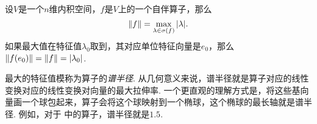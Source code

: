 \begin{theorem}\label{thm:symmetric-operator-norm}
    设$V$是一个$n$维内积空间，$f$是$V$上的一个自伴算子，那么
    \[\left\|f\right\|=\max_{\lambda\in\sigma(f)}|\lambda|.\]
    如果最大值在特征值$\lambda_0$取到，其对应单位特征向量是$e_0$，那么$\left\|f(e_0)\right\|=\left\|f\right\|=|\lambda_0|$.
\end{theorem}

最大的特征值模称为算子的\emph{谱半径}. 从几何意义来说，谱半径就是算子对应的线性变换对应的线性变换对向量的最大拉伸率. 一个更直观的理解方式是，将这些基向量画一个球包起来，算子会将这个球映射到一个椭球，这个椭球的最长轴就是谱半径. 例如，对于 中的算子，谱半径就是$1.5$. 